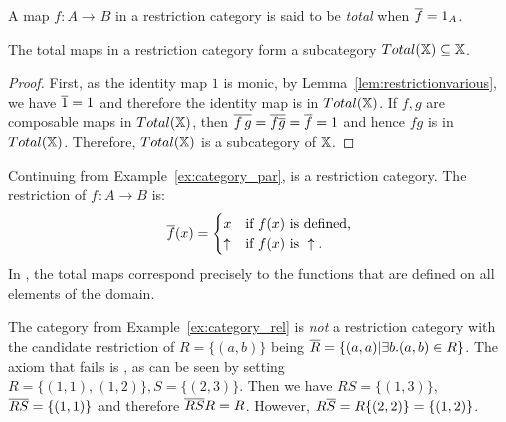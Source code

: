 \begin{definition}\label{def:total_map}
  A map $f:A\to B$ in a restriction category is said to be \emph{total} when
  $\overline{f} = 1_A$.
\end{definition}

\begin{lemma}\label{lem:total_maps_form_sub_category}
   The total maps in a restriction category form a subcategory  $Total(\mathbb{X}) \subseteq \mathbb{X}$.
\end{lemma}
\begin{proof}
  First, as the identity map $1$ is monic, by Lemma~\ref{lem:restrictionvarious}, we have $\overline{1} =
  1$ and therefore the identity map is in $Total(\mathbb{X})$. If $f,g$ are composable maps in $Total(\mathbb{X})$,
  then $\overline{f\,g} = \overline{f\overline{g}} = \overline{f} = 1$ and hence $f g$ is in $Total(\mathbb{X})$. Therefore,
  $Total(\mathbb{X})$ is a subcategory of $\mathbb{X}$.
\end{proof}
\begin{example}[\Par]\label{ex:par_is_a_restriction_category}
Continuing from Example~\ref{ex:category_par}, \Par is a restriction category. The restriction of $f:A\to B$ is:
\[
  \overline{f}(x) =
  \begin{cases}
    x&\text{if $f(x)$ is defined,}\\
    \uparrow&\text{if }f(x)\text{ is }\uparrow.
  \end{cases}
\]
In \Par, the
total maps correspond precisely to the functions that are defined on all elements of the domain.
\end{example}

\begin{example}[\rel]\label{ex:rel_is_not_a_restriction_category}
The category \rel from Example~\ref{ex:category_rel} is \emph{not} a restriction category with the
candidate restriction of $R=\{(a,b)\}$ being $\overline{R} = \{(a,a) | \exists b. (a,b) \in R\}$. The
axiom that fails is \rfour, as can be seen by setting $R=\{(1,1),(1,2)\}, S=\{(2,3)\}$. Then we
have $RS = \{(1,3)\}$, $\overline{RS} = \{(1,1)\}$ and therefore $\overline{RS} R = R$. However,
$R\overline{S} = R\{(2,2)\} = \{(1,2)\}$.
\end{example}

